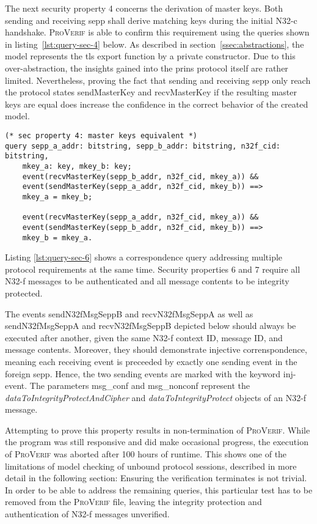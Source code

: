 The next security property 4 concerns the derivation of master keys.
Both sending and receiving \gls{sepp} shall derive matching keys during the initial N32-c handshake.
\textsc{ProVerif} is able to confirm this requirement using the queries shown in listing~\ref{lst:query-sec-4} below.
As described in section~\ref{ssec:abstractions}, the model represents the \gls{tls} export function by a private constructor.
Due to this over-abstraction, the insights gained into the \gls{prins} protocol itself are rather limited.
Nevertheless, proving the fact that sending and receiving \gls{sepp} only reach the protocol states {\sffamily sendMasterKey} and {\sffamily recvMasterKey} if the resulting master keys are equal does increase the confidence in the correct behavior of the created model.

\begin{lstlisting}[caption={Query for security property 4},label={lst:query-sec-4},firstnumber=348]
(* sec property 4: master keys equivalent *)
query sepp_a_addr: bitstring, sepp_b_addr: bitstring, n32f_cid: bitstring,
    mkey_a: key, mkey_b: key;
    event(recvMasterKey(sepp_b_addr, n32f_cid, mkey_a)) &&
    event(sendMasterKey(sepp_a_addr, n32f_cid, mkey_b)) ==>
    mkey_a = mkey_b;

    event(recvMasterKey(sepp_a_addr, n32f_cid, mkey_a)) &&
    event(sendMasterKey(sepp_b_addr, n32f_cid, mkey_b)) ==>
    mkey_b = mkey_a.
\end{lstlisting}

Listing \ref{lst:query-sec-6} shows a correspondence query addressing multiple protocol requirements at the same time.
Security properties 6 and 7 require all N32-f messages to be authenticated and all message contents to be integrity protected.

The events {\sffamily sendN32fMsgSeppB} and {\sffamily recvN32fMsgSeppA} as well as {\sffamily sendN32fMsgSeppA} and {\sffamily recvN32fMsgSeppB} depicted below should always be executed after another, given the same N32-f context ID, message ID, and message contents.
Moreover, they should demonstrate injective correnspondence, meaning each receiving event is preceeded by exactly one sending event in the foreign \gls{sepp}.
Hence, the two sending events are marked with the keyword {\sffamily inj-event}.
The parameters {\sffamily msg\_conf} and {\sffamily msg\_nonconf} represent the \textit{dataToIntegrityProtectAndCipher} and \textit{dataToIntegrityProtect} objects of an N32-f message.

Attempting to prove this property results in non-termination of \textsc{ProVerif}. While the program was still responsive and did make occasional progress, the execution of \textsc{ProVerif} was aborted after 100 hours of runtime.
This shows one of the limitations of model checking of unbound protocol sessions, described in more detail in the following section: Ensuring the verification terminates is not trivial.
In order to be able to address the remaining queries, this particular test has to be removed from the \textsc{ProVerif} file, leaving the integrity protection and authentication of N32-f messages unverified.

